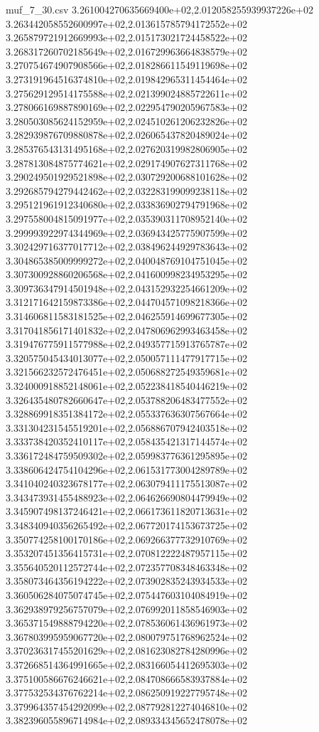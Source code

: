 \begin{filecontents*}{muf_7_30.csv}
3.261004270635669400e+02,2.012058255939937226e+02
3.263442058552600997e+02,2.013615785794172552e+02
3.265879721912669993e+02,2.015173021724458522e+02
3.268317260702185649e+02,2.016729963664838579e+02
3.270754674907908566e+02,2.018286611549119698e+02
3.273191964516374810e+02,2.019842965311454464e+02
3.275629129514175588e+02,2.021399024885722611e+02
3.278066169887890169e+02,2.022954790205967583e+02
3.280503085624152959e+02,2.024510261206232826e+02
3.282939876709880878e+02,2.026065437820489024e+02
3.285376543131495168e+02,2.027620319982806905e+02
3.287813084875774621e+02,2.029174907627311768e+02
3.290249501929521898e+02,2.030729200688101628e+02
3.292685794279442462e+02,2.032283199099238118e+02
3.295121961912340680e+02,2.033836902794791968e+02
3.297558004815091977e+02,2.035390311708952140e+02
3.299993922974344969e+02,2.036943425775907599e+02
3.302429716377017712e+02,2.038496244929783643e+02
3.304865385009999272e+02,2.040048769104751045e+02
3.307300928860206568e+02,2.041600998234953295e+02
3.309736347914501948e+02,2.043152932254661209e+02
3.312171642159873386e+02,2.044704571098218366e+02
3.314606811583181525e+02,2.046255914699677305e+02
3.317041856171401832e+02,2.047806962993463458e+02
3.319476775911577988e+02,2.049357715913765787e+02
3.320575045434013077e+02,2.050057111477917715e+02
3.321566232572476451e+02,2.050688272549359681e+02
3.324000918852148061e+02,2.052238418540446219e+02
3.326435480782660647e+02,2.053788206483477552e+02
3.328869918351384172e+02,2.055337636307567664e+02
3.331304231545519201e+02,2.056886707942403518e+02
3.333738420352410117e+02,2.058435421317144574e+02
3.336172484759509302e+02,2.059983776361295895e+02
3.338606424754104296e+02,2.061531773004289789e+02
3.341040240323678177e+02,2.063079411175513087e+02
3.343473931455488923e+02,2.064626690804479949e+02
3.345907498137246421e+02,2.066173611820713631e+02
3.348340940356265492e+02,2.067720174153673725e+02
3.350774258100170186e+02,2.069266377732910769e+02
3.353207451356415731e+02,2.070812222487957115e+02
3.355640520112572744e+02,2.072357708348463348e+02
3.358073464356194222e+02,2.073902835243934533e+02
3.360506284075074745e+02,2.075447603104084919e+02
3.362938979256757079e+02,2.076992011858546903e+02
3.365371549888794220e+02,2.078536061436961973e+02
3.367803995959067720e+02,2.080079751768962524e+02
3.370236317455201629e+02,2.081623082784280996e+02
3.372668514364991665e+02,2.083166054412695303e+02
3.375100586676246621e+02,2.084708666583937884e+02
3.377532534376762214e+02,2.086250919227795748e+02
3.379964357454292099e+02,2.087792812274046810e+02
3.382396055896714984e+02,2.089334345652478078e+02

\end{filecontents*}
